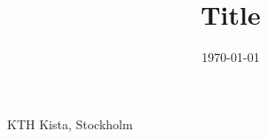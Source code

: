 \documentclass[11pt,a4paper,oneside]{article}
\title{Title}
\date{\today}  %
\begin{document}

\maketitle	%
\begin{center}
KTH Kista, Stockholm
\end{center}
\thispagestyle{empty}

\newpage
\renewcommand{\contentsname}{Innehållsförteckning}
\tableofcontents
\thispagestyle{empty}

\newpage  %










\newpage  %
\renewcommand\refname{Referenser}
\clearpage
{}

\end{document}
